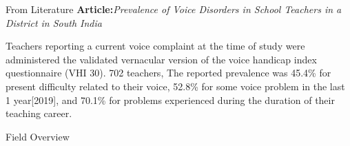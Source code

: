 \documentclass{beamer}
\begin{document}
\begin{frame}{From Literature}
\textbf{Article:}\textit{Prevalence of Voice Disorders in School Teachers in a District in South India}
\begin{tcolorbox}[colback=green!5,colframe=green!40!black,title=Results]
Teachers reporting a current voice complaint at the time of study were administered the validated vernacular version of the voice handicap index questionnaire (VHI 30). 702 teachers, The reported prevalence was 45.4\% for present difficulty related to their voice, 52.8\% for some voice problem in the last 1 year[2019], and 70.1\% for problems experienced during the duration of their teaching career.
\end{tcolorbox}
\end{frame}
\begin{frame}{Field Overview}
\centering
{}
    
\end{frame}
\end{document}
